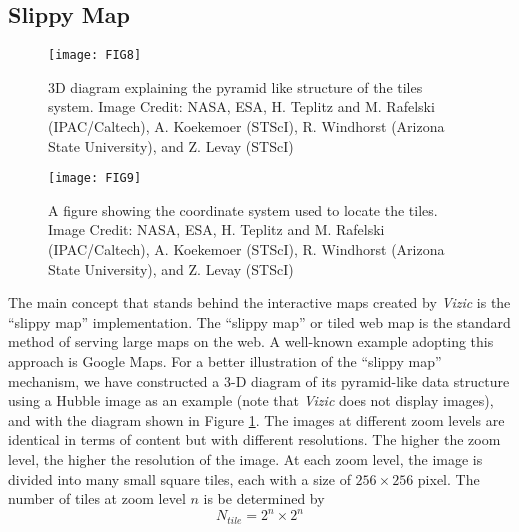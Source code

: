 \documentclass[../vis.tex]{subfiles}
\begin{document}
\subsection{Slippy Map}
\begin{figure}[h]
  \centering
  \texttt{[image: FIG8]}
  \captionsetup{width=0.45\textwidth}
  \caption{3D diagram explaining the pyramid like structure of the tiles system. Image Credit: NASA, ESA, H. Teplitz and M. Rafelski (IPAC/Caltech), A. Koekemoer (STScI), R. Windhorst (Arizona State University), and Z. Levay (STScI)}
  \label{fig:tilepyramid}
\end{figure}
\begin{figure}[h!]
  \centering
  \texttt{[image: FIG9]}
  \captionsetup{width=0.45\textwidth}
  \caption{A figure showing the coordinate system used to locate the tiles. Image Credit: NASA, ESA, H. Teplitz and M. Rafelski (IPAC/Caltech), A. Koekemoer (STScI), R. Windhorst (Arizona State University), and Z. Levay (STScI)}
  \label{fig:coord}
\end{figure}

The main concept that stands behind the interactive maps created by \textit{Vizic} is the ``slippy map'' implementation.
The ``slippy map'' or tiled web map is the standard method of serving large maps on the web.
A well-known example adopting this approach is Google Maps. For a better illustration of the ``slippy map'' mechanism, we have constructed a 3-D diagram of its pyramid-like data structure using a Hubble image as an example (note that \textit{Vizic} does not display images), and with the diagram shown in Figure \ref{fig:tilepyramid}.
The images at different zoom levels are identical in terms of content but with different resolutions.
The higher the zoom level, the higher the resolution of the image. At each zoom level, the image is divided into many small square tiles, each with a size of $256 \times 256$ pixel.
The number of tiles at zoom level $n$ is be determined by
\begin{equation*}
N_{tile} = 2^{n} \times 2^{n}
\end{equation*}
\label{slippy}
\end{document}
